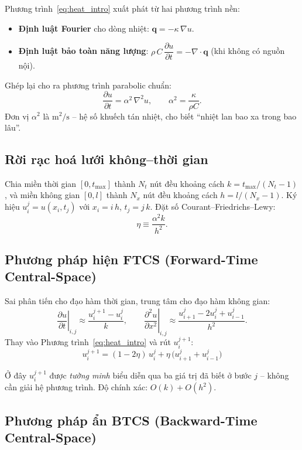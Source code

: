 \documentclass[12pt,a4paper]{article}
\begin{document}
Phương trình~\eqref{eq:heat_intro} xuất phát từ hai phương trình nền:
\begin{itemize}
    \item \textbf{Định luật Fourier} cho dòng nhiệt: $\mathbf{q} = -\kappa\,\nabla u$.
    \item \textbf{Định luật bảo toàn năng lượng}: $\rho\,C\,\dfrac{\partial u}{\partial t} = -\nabla\cdot\mathbf{q}$ (khi không có nguồn nội).
\end{itemize}
Ghép lại cho ra phương trình parabolic chuẩn:
\[
    \frac{\partial u}{\partial t} = \alpha^2\,\nabla^2 u, \qquad
    \alpha^2 = \frac{\kappa}{\rho C}.
\]
Đơn vị $\alpha^2$ là $\mathrm{m^2/s}$ -- hệ số khuếch tán nhiệt, cho biết ``nhiệt lan bao xa trong bao lâu''.

\subsection{Rời rạc hoá lưới không--thời gian}

Chia miền thời gian $[0, t_{\max}]$ thành $N_t$ nút đều khoảng cách $k = t_{\max}/(N_t - 1)$, và miền không gian $[0, l]$ thành $N_x$ nút đều khoảng cách $h = l/(N_x - 1)$. Ký hiệu $u_i^j = u(x_i, t_j)$ với $x_i = i\,h$, $t_j = j\,k$. Đặt số Courant--Friedrichs--Lewy:
\begin{equation}
    \eta \equiv \frac{\alpha^2 k}{h^2}.
    \label{eq:eta}
\end{equation}

\subsection{Phương pháp hiện FTCS (Forward-Time Central-Space)}

Sai phân tiến cho đạo hàm thời gian, trung tâm cho đạo hàm không gian:
\[
    \left.\frac{\partial u}{\partial t}\right|_{i,j} \approx \frac{u_i^{j+1} - u_i^j}{k}, \qquad
    \left.\frac{\partial^2 u}{\partial x^2}\right|_{i,j} \approx \frac{u_{i+1}^j - 2u_i^j + u_{i-1}^j}{h^2}.
\]
Thay vào Phương trình~\eqref{eq:heat_intro} và rút $u_i^{j+1}$:
\begin{equation}
    \boxed{\; u_i^{j+1} = (1 - 2\eta)\,u_i^j + \eta\,\bigl(u_{i+1}^j + u_{i-1}^j\bigr) \;}
    \label{eq:FTCS}
\end{equation}

Ở đây $u_i^{j+1}$ được \emph{tường minh} biểu diễn qua ba giá trị đã biết ở bước $j$ -- không cần giải hệ phương trình. Độ chính xác: $O(k) + O(h^2)$.

\subsection{Phương pháp ẩn BTCS (Backward-Time Central-Space)}
\end{document}
